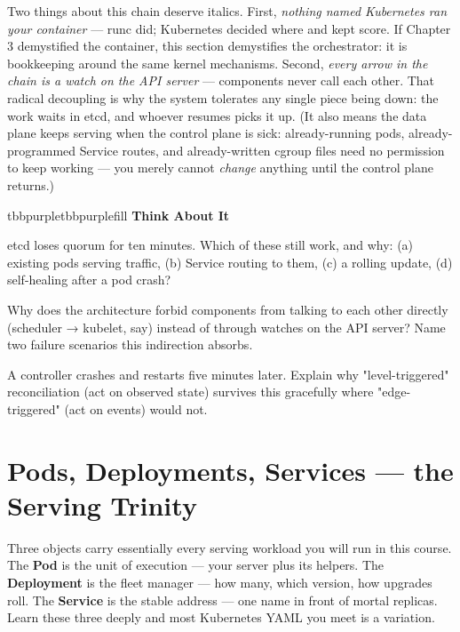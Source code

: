 Two things about this chain deserve italics. First, \textit{nothing named Kubernetes ran your container} — runc did; Kubernetes decided where and kept score. If Chapter 3 demystified the container, this section demystifies the orchestrator: it is bookkeeping around the same kernel mechanisms. Second, \textit{every arrow in the chain is a watch on the API server} — components never call each other. That radical decoupling is why the system tolerates any single piece being down: the work waits in etcd, and whoever resumes picks it up. (It also means the data plane keeps serving when the control plane is sick: already-running pods, already-programmed Service routes, and already-written cgroup files need no permission to keep working — you merely cannot \textit{change} anything until the control plane returns.)

\begin{calloutbox}{tbbpurple}{tbbpurplefill}
{\normalsize\bfseries\color{tbbpurple}Think About It}\par\vspace{3pt}
\begin{tbbitemize}
  \item etcd loses quorum for ten minutes. Which of these still work, and why: (a) existing pods serving traffic, (b) Service routing to them, (c) a rolling update, (d) self-healing after a pod crash?
  \item Why does the architecture forbid components from talking to each other directly (scheduler → kubelet, say) instead of through watches on the API server? Name two failure scenarios this indirection absorbs.
  \item A controller crashes and restarts five minutes later. Explain why "level-triggered" reconciliation (act on observed state) survives this gracefully where "edge-triggered" (act on events) would not.
\end{tbbitemize}
\end{calloutbox}

\section{Pods, Deployments, Services — the Serving Trinity}

Three objects carry essentially every serving workload you will run in this course. The \textbf{Pod} is the unit of execution — your server plus its helpers. The \textbf{Deployment} is the fleet manager — how many, which version, how upgrades roll. The \textbf{Service} is the stable address — one name in front of mortal replicas. Learn these three deeply and most Kubernetes YAML you meet is a variation.

